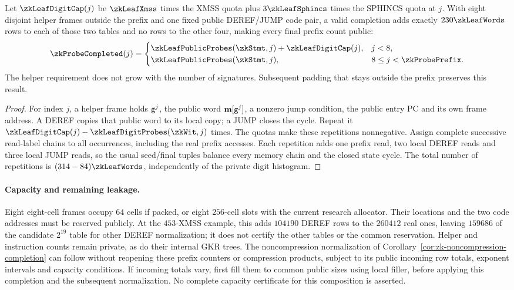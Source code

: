\begin{corollary}\label{cor:zk-leaf-probe-completion}
Let $\zkLeafDigitCap(j)$ be $\zkLeafXmss$ times the XMSS quota plus $3\zkLeafSphincs$ times the SPHINCS quota at $j$. With eight disjoint helper frames outside the prefix and one fixed public DEREF/JUMP code pair, a valid completion adds exactly $230\zkLeafWords$ rows to each of those two tables and no rows to the other four, making every final prefix count public:
\[
 \zkProbeCompleted(j)=
 \begin{cases}
 \zkLeafPublicProbes(\zkStmt,j)+\zkLeafDigitCap(j),&j<8,\\
 \zkLeafPublicProbes(\zkStmt,j),&8\le j<\zkProbePrefix.
 \end{cases}
\]
The helper requirement does not grow with the number of signatures. Subsequent padding that stays outside the prefix preserves this result.
\end{corollary}
\begin{proof}
For index $j$, a helper frame holds $\mathsf{g}^j$, the public word $\mathbf{m}[\mathsf{g}^j]$, a nonzero jump condition, the public entry PC and its own frame address. A DEREF copies that public word to its local copy; a JUMP closes the cycle. Repeat it $\zkLeafDigitCap(j)-\zkLeafDigitProbes(\zkWit,j)$ times. The quotas make these repetitions nonnegative. Assign complete successive read-label chains to all occurrences, including the real prefix accesses. Each repetition adds one prefix read, two local DEREF reads and three local JUMP reads, so the usual seed/final tuples balance every memory chain and the closed state cycle. The total number of repetitions is $(314-84)\zkLeafWords$, independently of the private digit histogram.
\end{proof}

\paragraph{Capacity and remaining leakage.} Eight eight-cell frames occupy $64$ cells if packed, or eight $256$-cell slots with the current research allocator. Their locations and the two code addresses must be reserved publicly. At the $453$-XMSS example, this adds $104190$ DEREF rows to the $260412$ real ones, leaving $159686$ of the candidate $2^{19}$ table for other DEREF normalization; it does not certify the other tables or the common reservation. Helper and instruction counts remain private, as do their internal GKR trees. The noncompression normalization of Corollary~\ref{cor:zk-noncompression-completion} can follow without reopening these prefix counters or compression products, subject to its public incoming row totals, exponent intervals and capacity conditions. If incoming totals vary, first fill them to common public sizes using local filler, before applying this completion and the subsequent normalization. No complete capacity certificate for this composition is asserted.


